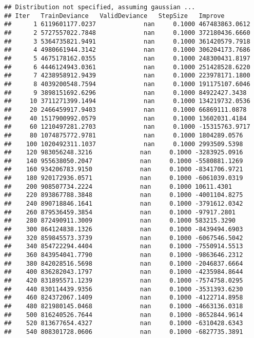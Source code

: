 \documentclass[
]{article}
\begin{document}
\begin{verbatim}
## Distribution not specified, assuming gaussian ...
## Iter   TrainDeviance   ValidDeviance   StepSize   Improve
##      1 6119601177.0237             nan     0.1000 467483863.0612
##      2 5727557022.7848             nan     0.1000 372180436.6660
##      3 5364735821.9491             nan     0.1000 361420579.7918
##      4 4980661944.3142             nan     0.1000 306204173.7686
##      5 4675178162.0355             nan     0.1000 248300431.8197
##      6 4446124943.0361             nan     0.1000 251428528.6220
##      7 4238958912.9439             nan     0.1000 223978171.1800
##      8 4039200548.7594             nan     0.1000 191175107.6046
##      9 3898151692.6296             nan     0.1000 84922427.3438
##     10 3711271399.1494             nan     0.1000 134219732.0536
##     20 2466459917.9403             nan     0.1000 66869111.0878
##     40 1517900992.0579             nan     0.1000 13602031.4184
##     60 1210497281.2703             nan     0.1000 -15315763.9717
##     80 1074875772.9781             nan     0.1000 1804289.0576
##    100 1020492311.1037             nan     0.1000 2993509.5398
##    120 983056248.3216             nan     0.1000 -3283925.0916
##    140 955638050.2047             nan     0.1000 -5580881.1269
##    160 934206783.9150             nan     0.1000 -8341706.9721
##    180 920172936.0571             nan     0.1000 -6061039.0319
##    200 908507734.2224             nan     0.1000 10611.4301
##    220 893867788.3848             nan     0.1000 -4001104.8275
##    240 890718846.1641             nan     0.1000 -3791612.0342
##    260 879536459.3854             nan     0.1000 -97917.2801
##    280 872490911.3009             nan     0.1000 583215.3290
##    300 864124838.1326             nan     0.1000 -8439494.6903
##    320 859845573.3739             nan     0.1000 -6067546.5042
##    340 854722294.4404             nan     0.1000 -7550914.5513
##    360 843954041.7790             nan     0.1000 -9863646.2312
##    380 842028516.5698             nan     0.1000 -2046837.6664
##    400 836282043.1797             nan     0.1000 -4235984.8644
##    420 831895571.1239             nan     0.1000 -7574758.0295
##    440 830114439.9356             nan     0.1000 -3531393.6230
##    460 824372067.1409             nan     0.1000 -4122714.8958
##    480 821980145.0468             nan     0.1000 -4663136.0318
##    500 816240526.7644             nan     0.1000 -8652844.9614
##    520 813677654.4327             nan     0.1000 -6310428.6343
##    540 808301728.0606             nan     0.1000 -6827735.3891

\end{verbatim}
\end{document}
